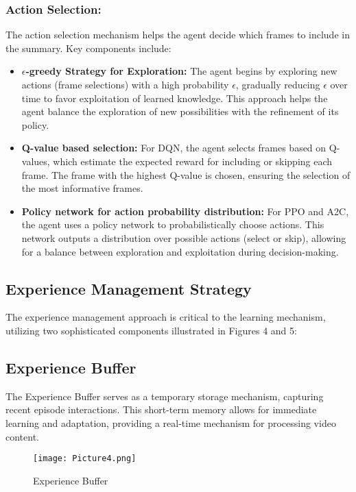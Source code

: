 \documentclass[conference]{IEEEtran}
\begin{document}
\subsubsection{\textbf{ Action Selection:}}
The action selection mechanism helps the agent decide which frames to include in the summary. Key components include:
\begin{itemize}
\item \textbf{\(\epsilon\)-greedy Strategy for Exploration:} The agent begins by exploring new actions (frame selections) with a high probability \(\epsilon\), gradually reducing \(\epsilon\) over time to favor exploitation of learned knowledge. This approach helps the agent balance the exploration of new possibilities with the refinement of its policy.

\item \textbf{Q-value based selection:} For DQN, the agent selects frames based on Q-values, which estimate the expected reward for including or skipping each frame. The frame with the highest Q-value is chosen, ensuring the selection of the most informative frames.
\item \textbf{Policy network for action probability distribution:} For PPO and A2C, the agent uses a policy network to probabilistically choose actions. This network outputs a distribution over possible actions (select or skip), allowing for a balance between exploration and exploitation during decision-making.
\end{itemize}

\subsection{\textbf{Experience Management Strategy}}
The experience management approach is critical to the learning mechanism, utilizing two sophisticated components illustrated in Figures 4 and 5:

\subsection{\textbf{Experience Buffer}}
The Experience Buffer serves as a temporary storage mechanism, capturing recent episode interactions. This short-term memory allows for immediate learning and adaptation, providing a real-time mechanism for processing video content.

\begin{figure}[htbp]
\centerline{\texttt{[image: Picture4.png]}}
\caption{Experience Buffer}
\label{fig}
\end{figure}
\end{document}
